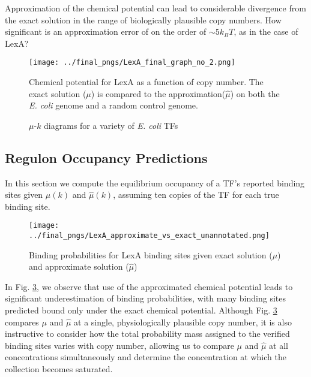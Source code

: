 \documentclass{article}
\begin{document}
Approximation of the chemical potential can lead to considerable
divergence from the exact solution in the range of biologically
plausible copy numbers.  How significant is an approximation error of
on the order of $\sim 5k_BT$, as in the case of LexA?


\begin{figure}[ht]
  \centering
  \texttt{[image: ../final\_pngs/LexA\_final\_graph\_no\_2.png]}
  \caption{Chemical potential for LexA as a function of copy number.
    The exact solution ($\mu$) is compared to the approximation($\hat\mu$) on both the
    \textit{E. coli} genome and a random control genome.}
  \label{fig:LexA_mu_vs_k}
\end{figure}



\begin{figure}[ht]
  \centering
  \caption{$\mu$-$k$ diagrams for a variety of \textit{E. coli} TFs}
  \label{fig:mu_vs_k_examples}
\end{figure}

\subsection{Regulon Occupancy Predictions}
In this section we compute the equilibrium occupancy of a TF's
reported binding sites given $\mu(k)$ and $\hat\mu(k)$, assuming ten
copies of the TF for each true binding site.

  \begin{figure}[ht]
    \centering
    \texttt{[image: ../final\_pngs/LexA\_approximate\_vs\_exact\_unannotated.png]}
    \caption{Binding probabilities for LexA binding sites given exact solution ($\mu$) and approximate solution ($\hat\mu$)}
    \label{fig:LexA_site_killing_exp}
  \end{figure}

  In Fig. \ref{fig:LexA_site_killing_exp}, we observe that use of the
  approximated chemical potential leads to significant underestimation
  of binding probabilities, with many binding sites predicted bound
  only under the exact chemical potential.  Although
  Fig. \ref{fig:LexA_site_killing_exp} compares $\mu$ and $\hat\mu$ at
  a single, physiologically plausible copy number, it is also
  instructive to consider how the total probability mass assigned to
  the verified binding sites varies with copy number, allowing us to
  compare $\mu$ and $\hat\mu$ at all concentrations simultaneously and
  determine the concentration at which the collection becomes saturated.
\end{document}
